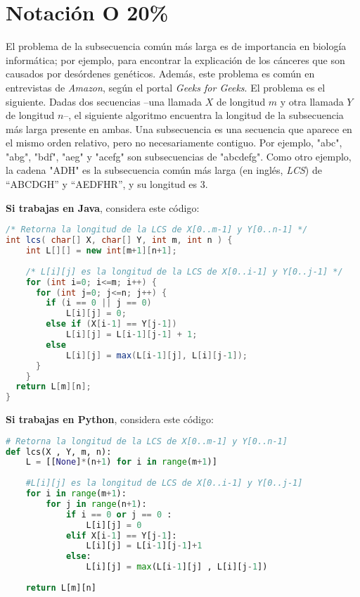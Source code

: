 \documentclass[10 pt]{article}
\begin{document}
\newpage




\section{Notación O 20\%}
El problema de la subsecuencia común más larga es de importancia en biología informática; por ejemplo, para encontrar la explicación de los cánceres que son causados
por desórdenes genéticos. Además, este problema es común en entrevistas de \emph{Amazon}, según el portal \emph{Geeks for Geeks}. El problema es el siguiente. 
Dadas dos secuencias --una llamada $X$ de longitud $m$ y otra llamada $Y$ de longitud $n$--, el siguiente algoritmo encuentra la longitud de la subsecuencia más larga presente en ambas. Una subsecuencia es una secuencia que aparece en el mismo orden relativo, pero no necesariamente contiguo. Por ejemplo, "abc", "abg", "bdf", "aeg" y "acefg" son subsecuencias de "abcdefg". Como otro ejemplo, la cadena "ADH" es la subsecuencia común más larga (en inglés, \emph{LCS}) de “ABCDGH” y “AEDFHR”, y su longitud es 3. 

\hspace{1cm}

\textbf{Si trabajas en Java}, considera este código:


\begin{lstlisting}[language=Java]
/* Retorna la longitud de la LCS de X[0..m-1] y Y[0..n-1] */
int lcs( char[] X, char[] Y, int m, int n ) { 
    int L[][] = new int[m+1][n+1]; 
  
    /* L[i][j] es la longitud de la LCS de X[0..i-1] y Y[0..j-1] */
    for (int i=0; i<=m; i++) { 
      for (int j=0; j<=n; j++) { 
        if (i == 0 || j == 0) 
            L[i][j] = 0; 
        else if (X[i-1] == Y[j-1]) 
            L[i][j] = L[i-1][j-1] + 1; 
        else
            L[i][j] = max(L[i-1][j], L[i][j-1]); 
      } 
    } 
  return L[m][n]; 
} 
\end{lstlisting}


\hspace{1cm}

\textbf{Si trabajas en Python}, considera este código:


\begin{lstlisting}[language=Python]
# Retorna la longitud de la LCS de X[0..m-1] y Y[0..n-1]
def lcs(X , Y, m, n): 
    L = [[None]*(n+1) for i in range(m+1)] 
  
    #L[i][j] es la longitud de LCS de X[0..i-1] y Y[0..j-1]
    for i in range(m+1): 
        for j in range(n+1): 
            if i == 0 or j == 0 : 
                L[i][j] = 0
            elif X[i-1] == Y[j-1]: 
                L[i][j] = L[i-1][j-1]+1
            else: 
                L[i][j] = max(L[i-1][j] , L[i][j-1]) 
  
    return L[m][n] 
\end{lstlisting}
\end{document}
